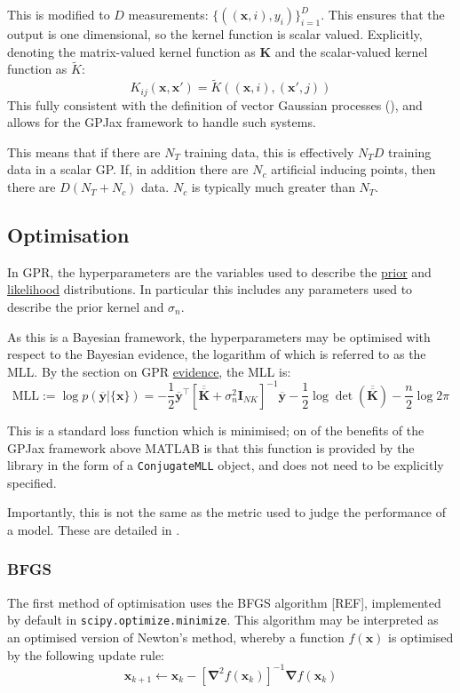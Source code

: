 \documentclass[12pt,a4paper,twoside]{report}
\theoremstyle{definition}
\begin{document}
This is modified to $D$ measurements: $\{((\mathbf x, i), y_i)\}_{i=1}^D$. This ensures that the output is one dimensional, so the kernel function is scalar valued. Explicitly, denoting the matrix-valued kernel function as $\mathbf K$ and the scalar-valued kernel function as $\tilde K$:
$$K_{ij}(\mathbf x,\mathbf x') = \tilde K((\mathbf x,i),(\mathbf x',j))$$
This fully consistent with the definition of vector Gaussian processes (), and allows for the GPJax framework to handle such systems.

This means that if there are $N_T$ training data, this is effectively $N_TD$ training data in a scalar GP. If, in addition there are $N_c$ artificial inducing points, then there are $D(N_T+N_c)$ data. $N_c$ is typically much greater than $N_T$.

\subsection{Optimisation}
In GPR, the hyperparameters are the variables used to describe the \hyperref[prior]{prior} and \hyperref[likelihood]{likelihood} distributions. In particular this includes any parameters used to describe the prior kernel and $\sigma_n$.

As this is a Bayesian framework, the hyperparameters may be optimised with respect to the Bayesian evidence, the logarithm of which is referred to as the MLL. By the section on GPR \hyperref[evidence]{evidence}, the MLL is:
\begin{equation*}
	\text{MLL} := \log p(\mathbf{\overline y}|\{\mathbf x\}) = -\frac{1}{2}\mathbf{\overline y}^\top \left[\mathbf{\overline{\overline K}} + \sigma_n^2 \mathbf I_{NK}\right]^{-1}\mathbf{\overline y} - \frac{1}{2}\log \det\left(\mathbf{\overline{\overline K}}\right) - \frac{n}{2}\log 2\pi
\end{equation*}

This is a standard loss function which is minimised; on of the benefits of the GPJax framework above MATLAB is that this function is provided by the library in the form of a \texttt{ConjugateMLL} object, and does not need to be explicitly specified.

Importantly, this is not the same as the metric used to judge the performance of a model. These are detailed in .

\subsubsection{BFGS}
The first method of optimisation uses the BFGS algorithm [REF], implemented by default in \texttt{scipy.optimize.minimize}. This algorithm may be interpreted as an optimised version of Newton's method, whereby a function $f(\mathbf x)$ is optimised by the following update rule:
$$\mathbf x_{k+1} \gets \mathbf x_k - [\boldsymbol \nabla^2 f (\mathbf x_k)]^{-1} \boldsymbol \nabla f(\mathbf x_k)$$
\end{document}
